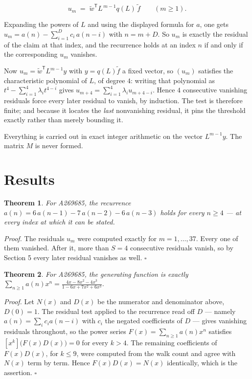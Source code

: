 \documentclass[11pt]{article}
\newtheorem{theorem}{Theorem}
\theoremstyle{definition}
\begin{document}
\[u_m \;=\; \tilde w^{\mathsf T} L^{\,m-1} q(L)\,\tilde f \qquad (m \ge 1).\]

Expanding the powers of $L$ and using the displayed formula for $a$, one gets $u_m = a(n) - \sum_{i=1}^{D} c_i\,a(n-i)$ with $n = m + D$. So $u_m$ is exactly the residual of the claim at that index, and the recurrence holds at an index $n$ if and only if the corresponding $u_m$ vanishes.

Now $u_m = \tilde w^{\mathsf T} L^{m-1} y$ with $y = q(L)\tilde f$ a fixed vector, so $(u_m)$ satisfies the characteristic polynomial of $L$, of degree $4$: writing that polynomial as $t^{4} - \sum_{i=1}^{4} \lambda_i t^{4-i}$ gives $u_{m+4} = \sum_{i=1}^{4} \lambda_i u_{m+4-i}$. Hence $4$ consecutive vanishing residuals force every later residual to vanish, by induction. The test is therefore finite; and because it locates the {\itshape last} nonvanishing residual, it pins the threshold exactly rather than merely bounding it.

Everything is carried out in exact integer arithmetic on the vector $L^{m-1}y$. The matrix $M$ is never formed.

\section{Results}

\begin{theorem} For A269685, the recurrence $a(n) = 6\,a(n-1) - 7\,a(n-2) - 6\,a(n-3)$ holds for every $n \ge 4$ --- at every index at which it can be stated.\end{theorem}

{\itshape Proof.} The residuals $u_m$ were computed exactly for $m = 1,\dots,37$. Every one of them vanished. After it, more than $S = 4$ consecutive residuals vanish, so by Section 5 every later residual vanishes as well. $\square$

\begin{theorem} For A269685, the generating function is exactly $\sum_{n\ge 1} a(n)x^n = \frac{4x - 8x^{2} - 4x^{3}}{1 - 6x + 7x^{2} + 6x^{3}}$.\end{theorem}

{\itshape Proof.} Let $N(x)$ and $D(x)$ be the numerator and denominator above, $D(0)=1$. The residual test applied to the recurrence read off $D$ --- namely $a(n) = \sum_i c_i a(n-i)$ with $c_i$ the negated coefficients of $D$ --- gives vanishing residuals throughout, so the power series $F(x)=\sum_{n\ge 1}a(n)x^n$ satisfies $[x^k]\bigl(F(x)D(x)\bigr) = 0$ for every $k > 4$. The remaining coefficients of $F(x)D(x)$, for $k \le 9$, were computed from the walk count and agree with $N(x)$ term by term. Hence $F(x)D(x) = N(x)$ identically, which is the assertion. $\square$
\end{document}
